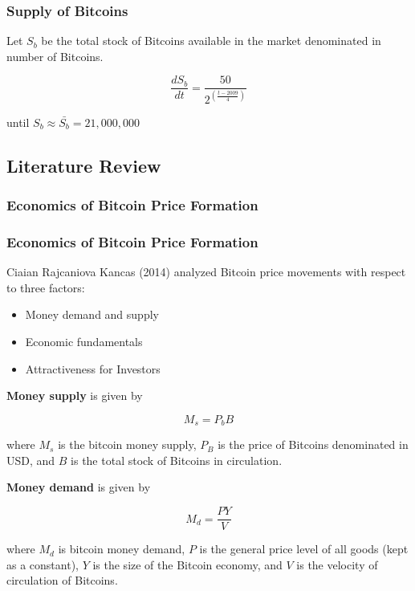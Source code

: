 \documentclass[9pt, compress]{beamer}
\begin{document}
\begin{frame}[fragile]
\frametitle{Supply of Bitcoins}
Let $S_b$ be the total stock of Bitcoins available in the market denominated in number of Bitcoins.

\[\frac{d S_b} {dt} =  \frac{50}{2^{\left(\frac{t - 2009}{4}\right)}}\]

until $S_b \approx \bar{S_b} = 21,000,000$ 
\end{frame}

\subsection{Literature Review}
\subsubsection{Economics of Bitcoin Price Formation}
\begin{frame}[fragile]
\frametitle{Economics of Bitcoin Price Formation}

Ciaian Rajcaniova Kancas (2014) analyzed Bitcoin price movements with respect to three factors: 
\begin{itemize}
\item Money demand and supply
\item Economic fundamentals
\item Attractiveness for Investors
\end{itemize}
\end{frame}

\begin{frame}[fragile]
\textbf{Money supply} is given by 

\[M_s = P_b B\]

where $M_s$ is the bitcoin money supply, $P_B$ is the price of Bitcoins denominated in USD, and $B$ is the total stock of Bitcoins in circulation.

\textbf{Money demand} is given by

\[M_d = \frac{PY}{V}\]

where $M_d$ is bitcoin money demand, $P$ is the general price level of all goods (kept as a constant), $Y$ is the size of the Bitcoin economy, and $V$ is the velocity of circulation of Bitcoins.
\end{frame}
\end{document}
